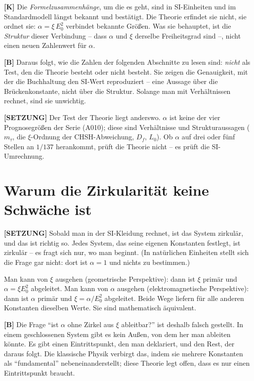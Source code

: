\textbf{[K]} Die \emph{Formelzusammenhänge}, um die es geht, sind in SI-Einheiten
und im Standardmodell längst bekannt und bestätigt. Die Theorie erfindet sie
nicht, sie ordnet sie: $\alpha = \xi\,E_0^2$ verbindet bekannte Größen. Was sie
behauptet, ist die \emph{Struktur} dieser Verbindung -- dass $\alpha$ und $\xi$
derselbe Freiheitsgrad sind --, nicht einen neuen Zahlenwert für $\alpha$.

\textbf{[B]} Daraus folgt, wie die Zahlen der folgenden Abschnitte zu lesen sind:
\emph{nicht} als Test, den die Theorie besteht oder nicht besteht. Sie zeigen die
Genauigkeit, mit der die Buchhaltung den SI-Wert reproduziert -- eine Aussage
über die Brückenkonstante, nicht über die Struktur. Solange man mit Verhältnissen
rechnet, sind sie unwichtig.

\textbf{[SETZUNG]} Der Test der Theorie liegt anderswo. $\alpha$ ist keine der
vier Prognosegrößen der Serie (A010); diese sind Verhältnisse und
Strukturaussagen ($m_\tau$, die $\xi$-Ordnung der CHSH-Abweichung, $D_f$, $L_0$).
Ob $\alpha$ auf drei oder fünf Stellen an $1/137$ herankommt, prüft die Theorie
nicht -- es prüft die SI-Umrechnung.

\section{Warum die Zirkularität keine Schwäche ist}

\textbf{[SETZUNG]} Sobald man in der SI-Kleidung rechnet, ist das System
zirkulär, und das ist richtig so. Jedes System, das seine eigenen Konstanten
festlegt, ist zirkulär -- es fragt sich nur, wo man beginnt. (In natürlichen
Einheiten stellt sich die Frage gar nicht: dort ist $\alpha = 1$ und nichts zu
bestimmen.)

Man kann von $\xi$ ausgehen (geometrische Perspektive): dann ist $\xi$ primär und
$\alpha = \xi E_0^2$ abgeleitet. Man kann von $\alpha$ ausgehen
(elektromagnetische Perspektive): dann ist $\alpha$ primär und
$\xi = \alpha/E_0^2$ abgeleitet. Beide Wege liefern für alle anderen Konstanten
dieselben Werte. Sie sind mathematisch äquivalent.

\textbf{[B]} Die Frage \enquote{ist $\alpha$ ohne Zirkel aus $\xi$ ableitbar?}
ist deshalb falsch gestellt. In einem geschlossenen System gibt es kein Außen,
von dem her man ableiten könnte. Es gibt einen Eintrittspunkt, den man
deklariert, und den Rest, der daraus folgt. Die klassische Physik verbirgt das,
indem sie mehrere Konstanten als \enquote{fundamental} nebeneinanderstellt; diese
Theorie legt offen, dass es nur einen Eintrittspunkt braucht.

